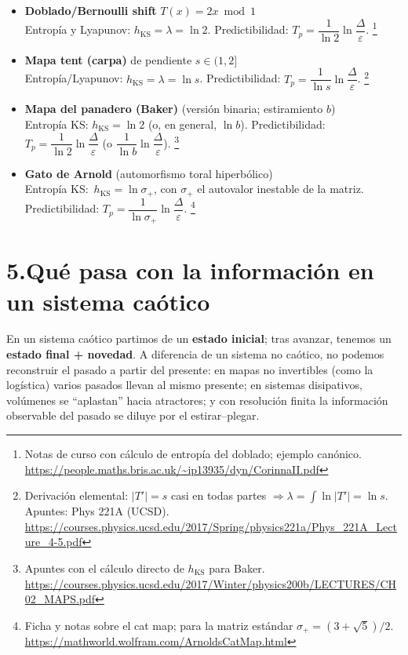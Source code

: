 \documentclass[11pt,a4paper]{article}
\begin{document}
\begin{itemize}
  \item \textbf{Doblado/Bernoulli shift} $T(x)=2x \bmod 1$\\
  Entropía y Lyapunov: $h_{\mathrm{KS}}=\lambda=\ln 2$. \quad
  Predictibilidad: $T_p=\dfrac{1}{\ln 2}\ln\dfrac{\Delta}{\varepsilon}$.%
  \footnote{Notas de curso con cálculo de entropía del doblado; ejemplo canónico. \url{https://people.maths.bris.ac.uk/~ip13935/dyn/CorinnaII.pdf}}
  
  \item \textbf{Mapa tent (carpa)} de pendiente $s\in(1,2]$\\
  Entropía/Lyapunov: $h_{\mathrm{KS}}=\lambda=\ln s$. \quad
  Predictibilidad: $T_p=\dfrac{1}{\ln s}\ln\dfrac{\Delta}{\varepsilon}$.%
  \footnote{Derivación elemental: $|T'|=s$ casi en todas partes $\Rightarrow \lambda=\int \ln|T'|=\ln s$. Apuntes: Phys 221A (UCSD). \url{https://courses.physics.ucsd.edu/2017/Spring/physics221a/Phys_221A_Lecture_4-5.pdf}}

  \item \textbf{Mapa del panadero (Baker)} (versión binaria; estiramiento $b$)\\
  Entropía KS: $h_{\mathrm{KS}}=\ln 2$ (o, en general, $\ln b$). \quad
  Predictibilidad: $T_p=\dfrac{1}{\ln 2}\ln\dfrac{\Delta}{\varepsilon}$ (o $\dfrac{1}{\ln b}\ln\dfrac{\Delta}{\varepsilon}$).%
  \footnote{Apuntes con el cálculo directo de $h_{\mathrm{KS}}$ para Baker. \url{https://courses.physics.ucsd.edu/2017/Winter/physics200b/LECTURES/CH02_MAPS.pdf}}

  \item \textbf{Gato de Arnold} (automorfismo toral hiperbólico)\\
  Entropía KS: $\,h_{\mathrm{KS}}=\ln \sigma_{+}$, con $\sigma_{+}$ el autovalor inestable de la matriz. \quad
  Predictibilidad: $T_p=\dfrac{1}{\ln\sigma_{+}}\ln\dfrac{\Delta}{\varepsilon}$.%
  \footnote{Ficha y notas sobre el cat map; para la matriz estándar $\sigma_{+}=(3+\sqrt{5})/2$. \url{https://mathworld.wolfram.com/ArnoldsCatMap.html}}
\end{itemize}

\section*{5.\;Qué pasa con la información en un sistema caótico}
En un sistema caótico partimos de un \textbf{estado inicial}; tras avanzar, tenemos un \textbf{estado final + novedad}. A diferencia de un sistema no caótico, no podemos reconstruir el pasado a partir del presente: en mapas no invertibles (como la logística) varios pasados llevan al mismo presente; en sistemas disipativos, volúmenes se ``aplastan'' hacia atractores; y con resolución finita la información observable del pasado se diluye por el estirar--plegar.
\end{document}
